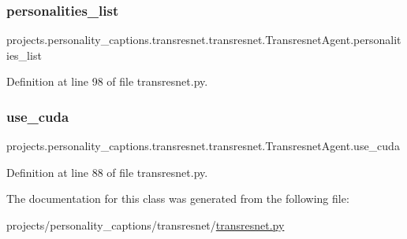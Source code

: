 \subsubsection{\texorpdfstring{personalities\+\_\+list}{personalities\_list}}
{\footnotesize\ttfamily projects.\+personality\+\_\+captions.\+transresnet.\+transresnet.\+Transresnet\+Agent.\+personalities\+\_\+list}



Definition at line 98 of file transresnet.\+py.

\mbox{\label{classprojects_1_1personality__captions_1_1transresnet_1_1transresnet_1_1TransresnetAgent_a0349367e2cc13a0765338adbe37f0161}} 
\subsubsection{\texorpdfstring{use\+\_\+cuda}{use\_cuda}}
{\footnotesize\ttfamily projects.\+personality\+\_\+captions.\+transresnet.\+transresnet.\+Transresnet\+Agent.\+use\+\_\+cuda}



Definition at line 88 of file transresnet.\+py.



The documentation for this class was generated from the following file\+:\begin{DoxyCompactItemize}
\item 
projects/personality\+\_\+captions/transresnet/\hyperlink{projects_2personality__captions_2transresnet_2transresnet_8py}{transresnet.\+py}\end{DoxyCompactItemize}
